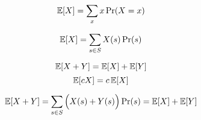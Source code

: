 
\begin{frame}{}
  \begin{definition}[Expectation]
    \[
      \operatorname*{\mathbb{E}}[X] = \sum_{x} x \Pr(X = x)
    \]
  \end{definition}

  \pause
  \vspace{0.60cm}
  \begin{theorem}
    \[
      \operatorname*{\mathbb{E}}[X] = \sum_{s \in S} X(s) \Pr(s)
    \]
  \end{theorem}
\end{frame}

\begin{frame}{}
  \begin{theorem} 
    \[
      \operatorname*{\mathbb{E}}[X + Y] = \operatorname*{\mathbb{E}}[X] + \operatorname*{\mathbb{E}}[Y]
    \]
    \[
      \operatorname*{\mathbb{E}}[c X] = c \operatorname*{\mathbb{E}}[X]
    \]
  \end{theorem}

  \pause
  \begin{align*}
    \operatorname*{\mathbb{E}}[X + Y] = \sum_{s \in S} \Big(X(s) + Y(s)\Big) \Pr(s) = \operatorname*{\mathbb{E}}[X] + \operatorname*{\mathbb{E}}[Y]
  \end{align*}
\end{frame}


